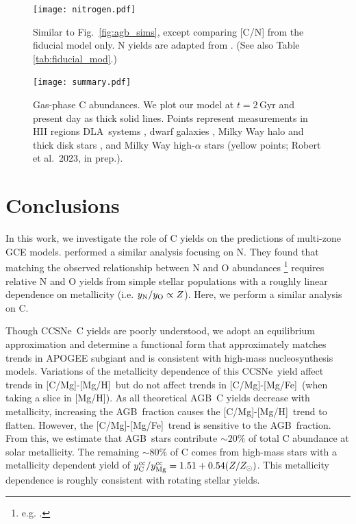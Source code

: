 \documentclass[fleqn,usenatbib]{mnras}
\newcommand{\citealtjack}{Robert et al.~2023, in prep.}
\newcommand{\cc}{CCSNe}
\newcommand{\agb}{AGB}
\newcommand{\dla}{DLA}
\newcommand{\gce}{GCE}
\newcommand{\apogee}{APOGEE}
\newcommand{\caah}{[C/Mg]-[Mg/H]}
\newcommand{\caafe}{[C/Mg]-[Mg/Fe]}
\newcommand{\Ycc}{\ensuremath{y_{\rm C}^{\rm cc}}}
\newcommand{\Yoc}{\ensuremath{y_{\rm Mg}^{\rm cc}}}
\newcommand{\about}[1]{${\sim} #1$}
\begin{document}
\begin{figure}
    \centering
    \texttt{[image: nitrogen.pdf]}
    \caption[C/N Abundance Agreement]{Similar to Fig.~\ref{fig:agb_sims}, except comparing [C/N] from the fiducial model only. N yields are adapted from \cite{james+23}. (See also Table \ref{tab:fiducial_mod}.)
    }
\end{figure}

\begin{figure}
\centering
\texttt{[image: summary.pdf]}
\caption[Gas-Phase Abundances]{Gas-phase C abundances. We plot our model at $t=2$\,Gyr and present day as thick solid lines. Points represent measurements in 
    HII regions    \citep[pink circles;][]{skillman+20, esteban+02, esteban+09, esteban+14, esteban+19}
    \dla\ systems \citep[blue triangles;][]{ellison+10, srianand+10, dutta+14, DZ+03, pettini+08, morrison+16,cooke+17},  %
    dwarf galaxies \citep[red diamonds;][]{berg+19},
    Milky Way halo and thick disk stars \citep[green stars;][]{nissen+14, fabbian+09},
    and Milky Way high-$\alpha$ stars (yellow points; \citealtjack).
}
\label{fig:gas_phase}
\end{figure}


\section{Conclusions}

In this work, we investigate the role of C yields on the predictions of multi-zone \gce{} models. \citet{james+23} performed a similar analysis focusing on N. They found that matching the observed relationship between N and O abundances%
\footnote{e.g. \citet{HEK00,PVT10,berg+12, berg+20, skillman+20, izotov+12, james2+15, dopita+16}.} requires relative N and O yields from simple stellar populations with a roughly linear dependence on metallicity (i.e. $y_{\rm N}/y_{\rm O} \propto Z$). 
Here, we perform a similar analysis on C. 

Though \cc\ C yields are poorly understood, we adopt an equilibrium approximation and determine a functional form that approximately matches trends in \apogee{} subgiant and is consistent with high-mass nucleosynthesis models. Variations of the metallicity dependence of this \cc\ yield affect trends in \caah~but do not affect trends in \caafe\ (when taking a slice in [Mg/H]). As all theoretical \agb\ C yields decrease with metallicity, increasing the \agb\ fraction causes the \caah\ trend to flatten. However, the \caafe\ trend is sensitive to the \agb\ fraction. 
From this, we estimate that \agb\ stars contribute \about{20\%} of total C abundance at solar metallicity. The remaining \about{80\%} of C comes from high-mass stars with a metallicity dependent yield of $\Ycc/\Yoc=1.51 + 0.54 (Z/Z_\odot)$. 
This metallicity dependence is roughly consistent with rotating stellar yields.
 
\end{document}
